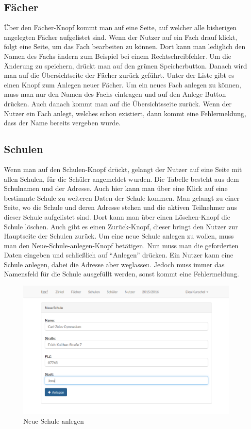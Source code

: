 \subsection{Fächer}
Über den Fächer-Knopf kommt man auf eine Seite, auf welcher alle bisherigen angelegten Fächer aufgelistet sind. Wenn der Nutzer auf ein Fach drauf klickt, folgt eine Seite, um das Fach bearbeiten zu können. Dort kann man lediglich den Namen des Fachs ändern zum Beispiel bei einem Rechtschreibfehler. Um die Änderung zu speichern, drückt man auf den grünen Speicherbutton. Danach wird man auf die Übersichtseite der Fächer zurück geführt. Unter der Liste gibt es einen Knopf zum Anlegen neuer Fächer. Um ein neues Fach anlegen zu können, muss man nur den Namen des Fachs eintragen und auf den Anlege-Button drücken. Auch danach kommt man auf die Übersichtsseite zurück. Wenn der Nutzer ein Fach anlegt, welches schon existiert, dann kommt eine Fehlermeldung, dass der Name bereits vergeben wurde.

\subsection{Schulen}
Wenn man auf den Schulen-Knopf drückt, gelangt der Nutzer auf eine Seite mit allen Schulen, für die Schüler angemeldet wurden. Die Tabelle besteht aus dem Schulnamen und der Adresse. Auch hier kann man über eine Klick auf eine bestimmte Schule zu weiteren Daten der Schule kommen. Man gelangt zu einer Seite, wo die Schule und deren Adresse stehen und die aktiven Teilnehmer aus dieser Schule aufgelistet sind. Dort kann man über einen Löschen-Knopf die Schule löschen. Auch gibt es einen Zurück-Knopf, dieser bringt den Nutzer zur Hauptseite der Schulen zurück. Um eine neue Schule anlegen zu wollen, muss man den Neue-Schule-anlegen-Knopf betätigen. Nun muss man die geforderten Daten eingeben und schließlich auf "`Anlegen"' drücken. Ein Nutzer kann eine Schule anlegen, dabei die Adresse aber weglassen. Jedoch muss immer das Namensfeld für die Schule ausgefüllt werden, sonst kommt eine Fehlermeldung.

\begin{figure}[ht]
	\centering
	\includegraphics[scale=.45]{bilder/Neue_Schule_anlegen.png}
	\caption{Neue Schule anlegen}
\end{figure}

